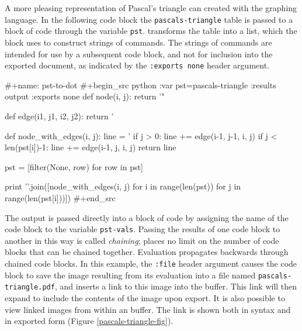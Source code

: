 \documentclass[article,shortnames]{jss}
\begin{document}
A more pleasing representation of Pascal's triangle can created with the 
graphing language.  In the following code block the \texttt{pascals-triangle}
table is passed to a block of  code through the
variable \texttt{pst}.   transforms the table into a  list,
which the  block uses to construct strings of  commands.  The
strings of  commands are intended for use by a subsequent code
block, and not for inclusion into the exported document, as indicated
by the \texttt{:exports none} header argument.


\begin{Code}
#+name: pst-to-dot
#+begin_src python :var pst=pascals-triangle :results output :exports none
  def node(i, j):
        return '"%

  def edge(i1, j1, i2, j2):
        return '%

  def node_with_edges(i, j):
        line = '%
        if j > 0:
              line += edge(i-1, j-1, i, j)
        if j < len(pst[i])-1:
              line += edge(i-1, j, i, j)
        return line

  pst = [filter(None, row) for row in pst]

  print '\n'.join([node_with_edges(i, j)
                   for i in range(len(pst))
                   for j in range(len(pst[i]))])
#+end_src
\end{Code}






The output is passed directly into a block of  code by assigning
the name of the  code block to the variable \texttt{pst-vals}.  Passing
the results of one code block to another in this way is called
\emph{chaining};  places no limit on the number of code blocks that
can be chained together.  Evaluation propagates backwards through
chained code blocks.  In this example, the \texttt{:file} header argument
causes the code block to save the image resulting from its evaluation
into a file named \texttt{pascals-triangle.pdf}, and inserts a link to this
image into the  buffer.  This link will then expand to include
the contents of the image upon export.  It is also possible to view
linked images from within an  buffer.  The link is shown both
in  syntax and in exported form (Figure
\ref{pascals-triangle-fig}).
\end{document}
